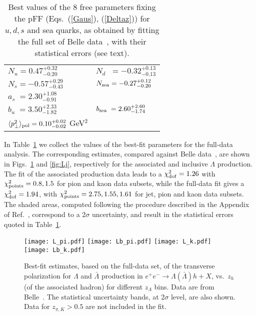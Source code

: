 \documentclass[submission, Proceedings]{SciPost}
\begin{document}
\begin{table}[t!]
\centering
\caption{
Best values of the 8 free parameters fixing the pFF (Eqs.~(\ref{Gaus}), (\ref{Deltaz})) for $u,d,s$ and sea quarks, as obtained by fitting the full set of Belle data~\cite{Guan:2018ckx}, with their statistical errors (see text).
\label{fitpar}}
\vskip 6pt
%
\renewcommand{\tabcolsep}{0.4pc} %
\renewcommand{\arraystretch}{1.} %
\begin{tabular}{@{}ll}
 \hline
 $N_{u} = 0.47^{+0.32}_{-0.20}$ & $N_{d} \;\;=  -0.32^{+0.13}_{-0.13}$ \\
 $N_{s} = -0.57^{+0.29}_{-0.43}$ & $N_{\rm sea} =  -0.27^{+0.12}_{-0.20}$\\
 $a_s \;= 2.30^{+1.08}_{-0.91}$ &\\
 $b_u \;= 3.50^{+2.33}_{-1.82}$ & $b_{\rm sea}  \;= 2.60^{+2.60}_{-1.74}$ \\
 \hline
  $\langle p^2_{\perp} \rangle_{\rm pol} = 0.10^{+0.02}_{-0.02}$ GeV$^2$ & \\
 \hline
\end{tabular}
\end{table}

In Table~\ref{fitpar} we collect the values of the best-fit parameters for the full-data analysis. The corresponding estimates, compared against Belle data~\cite{Guan:2018ckx}, are shown in Figs.~\ref{fig:Lh} and \ref{fig:Lj}, respectively for the associated  and inclusive $\Lambda$ production. The fit of the associated production data leads to a $\chi^2_{\rm dof} = 1.26$ with $\chi^2_{\rm points}= 0.8, 1.5$ for pion and kaon data subsets, while the full-data fit gives a $\chi^2_{\rm dof} =1.94$,
with $\chi^2_{\rm points} = 2.75, 1.55, 1.61$ for jet, pion and kaon data subsets.
The shaded areas, computed following the procedure described in the Appendix of Ref.~\cite{Anselmino:2008sga}, correspond to a 2$\sigma$ uncertainty, and result in the statistical errors quoted in Table~\ref{fitpar}.


%
\begin{figure}[!t]
\centering
\texttt{[image: L\_pi.pdf]}
\texttt{[image: Lb\_pi.pdf]}
\texttt{[image: L\_k.pdf]}
\texttt{[image: Lb\_k.pdf]}
\caption{Best-fit estimates, based on the full-data set, of the transverse polarization for $\Lambda$ and $\bar\Lambda$ production in $e^+e^-\to \Lambda(\bar\Lambda) h + X$, vs.~$z_{h}$ (of the associated hadron) for different $z_\Lambda$ bins. Data are from Belle~\cite{Guan:2018ckx}. The statistical uncertainty bands, at 2$\sigma$ level, are also shown. Data for $z_{\pi,K}>0.5$ are not included in the fit.}
\label{fig:Lh}
\end{figure}
%
\end{document}

